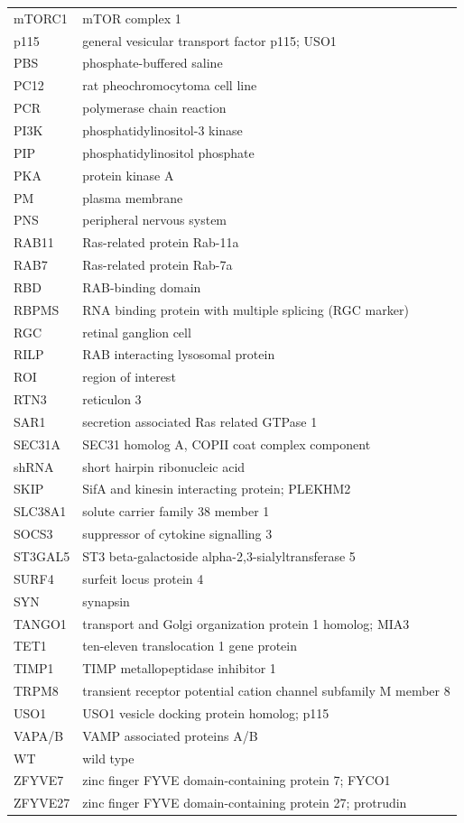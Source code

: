 \documentclass[
  12pt,
  a4paper,
]{book}
\begin{document}
\begin{longtable}[]{@{}
  >{\raggedright\arraybackslash}p{}
  >{\raggedright\arraybackslash}p{}@{}}
mTORC1 & mTOR complex 1 \\
p115 & general vesicular transport factor p115; USO1 \\
PBS & phosphate-buffered saline \\
PC12 & rat pheochromocytoma cell line \\
PCR & polymerase chain reaction \\
PI3K & phosphatidylinositol-3 kinase \\
PIP & phosphatidylinositol phosphate \\
PKA & protein kinase A \\
PM & plasma membrane \\
PNS & peripheral nervous system \\
RAB11 & Ras-related protein Rab-11a \\
RAB7 & Ras-related protein Rab-7a \\
RBD & RAB-binding domain \\
RBPMS & RNA binding protein with multiple splicing (RGC marker) \\
RGC & retinal ganglion cell \\
RILP & RAB interacting lysosomal protein \\
ROI & region of interest \\
RTN3 & reticulon 3 \\
SAR1 & secretion associated Ras related GTPase 1 \\
SEC31A & SEC31 homolog A, COPII coat complex component \\
shRNA & short hairpin ribonucleic acid \\
SKIP & SifA and kinesin interacting protein; PLEKHM2 \\
SLC38A1 & solute carrier family 38 member 1 \\
SOCS3 & suppressor of cytokine signalling 3 \\
ST3GAL5 & ST3 beta-galactoside alpha-2,3-sialyltransferase 5 \\
SURF4 & surfeit locus protein 4 \\
SYN & synapsin \\
TANGO1 & transport and Golgi organization protein 1 homolog; MIA3 \\
TET1 & ten-eleven translocation 1 gene protein \\
TIMP1 & TIMP metallopeptidase inhibitor 1 \\
TRPM8 & transient receptor potential cation channel subfamily M member 8 \\
USO1 & USO1 vesicle docking protein homolog; p115 \\
VAPA/B & VAMP associated proteins A/B \\
WT & wild type \\
ZFYVE7 & zinc finger FYVE domain-containing protein 7; FYCO1 \\
ZFYVE27 & zinc finger FYVE domain-containing protein 27; protrudin \\
\end{longtable}
\end{document}
